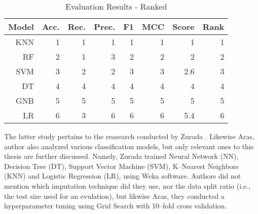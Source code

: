 \begin{table}[H]
    \small
    \setlength{\tabcolsep}{8pt}
    \renewcommand{\arraystretch}{1.3}
    \centering
    \caption[Evaluation Results - Ranked \citep{serkan2021bagging}]{Evaluation Results - Ranked \citep{serkan2021bagging}}\label{tab:serkanresultsranks}
    \begin{tabular}{r r r r r r r r}
    \toprule
    \textbf{Model} & \textbf{Acc.} & \textbf{Rec.} & \textbf{Prec.} & \textbf{F1} & \textbf{MCC} & \textbf{Score} & \textbf{Rank} \\
    \midrule
    \hline
	
    KNN & 1 & 1 & 1 & 1 & 1 & 1 & 1 \\ 
    RF & 2 & 1 & 3 & 2 & 2 & 2 & 2 \\ 
    SVM & 3 & 2 & 2 & 3 & 3 & 2.6 & 3 \\ 
    DT & 4 & 4 & 4 & 4 & 4 & 4 & 4 \\ 
    GNB & 5 & 5 & 5 & 5 & 5 & 5 & 5 \\ 
    LR & 6 & 3 & 6 & 6 & 6 & 5.4 & 6 \\ 
	
    \hline
    \bottomrule
    \end{tabular}
    \vspace{0.35em}
    
    \vspace{-1em}
\end{table}


The latter study pertains to the reasearch conducted by Zurada \citep{zurada2014classification}. Likewise Aras, author also analyzed various classification models, but only relevant ones to this thesis are further discussed.
Namely, Zurada trained Neural Network (NN), Decision Tree (DT), Support Vector Machine (SVM), K--Nearest Neighbors (KNN) and Logistic Regression (LR), using Weka software.
Authors did not mention which imputation technique did they use, nor the data split ratio (i.e., the test size used for an evulation), but likwise Aras, they conducted a hyperparameter tuning using Grid Search with 10--fold cross validation.

